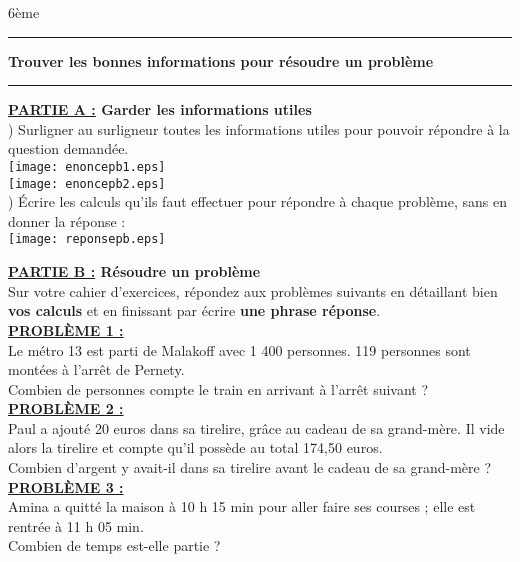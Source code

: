 \documentclass[a4paper,11pt]{article}
\newcounter{enumtabi}
\newcommand{\q}{\stepcounter{enumtabi} \theenumtabi)  }
\newcommand{\titre}[5] 
{
\noindent #2 \hfill #4 \\
#3 \hfill #5

\vspace{-1.6cm}

\begin{center}\rule{6cm}{0.5mm}\end{center}
\vspace{0.2cm}
\begin{center}{\large{\textbf{#1}}}\end{center}
\begin{center}\rule{6cm}{0.5mm}\end{center}
}
\begin{document}
\pagestyle{empty}
\titre{Trouver les bonnes informations pour résoudre un problème}{}{}{6ème}{}


\vspace*{1cm}

{\large \textbf{\underline{PARTIE A :} Garder les informations utiles}}\\


\q Surligner au surligneur toutes les informations utiles pour pouvoir répondre à la question demandée.\\

\texttt{[image: enoncepb1.eps]} \\

\texttt{[image: enoncepb2.eps]} \\

\q Écrire les calculs qu'ils faut effectuer pour répondre à chaque problème, sans en donner la réponse :\\

\texttt{[image: reponsepb.eps]} 

\newpage


{\large \textbf{\underline{PARTIE B :} Résoudre un problème}}\\

Sur votre cahier d'exercices, répondez aux problèmes suivants en détaillant bien \textbf{vos calculs} et en finissant par écrire \textbf{une phrase réponse}.\\

\underline{\textbf{PROBLÈME 1 : }}\\

Le métro 13 est parti de Malakoff avec 1 400 personnes. 119 personnes sont montées à l’arrêt de Pernety.\\
Combien de personnes compte le train en arrivant à l'arrêt suivant ?\\

\underline{\textbf{PROBLÈME 2 :} }\\


Paul a ajouté 20 euros dans sa tirelire, grâce au cadeau de sa grand-mère. Il vide alors la tirelire et compte qu'il possède au total 174,50 euros. \\
Combien d'argent y avait-il dans sa tirelire avant le cadeau de sa grand-mère ?\\


\underline{\textbf{PROBLÈME 3 :} }\\

Amina a quitté la maison à 10 h 15 min pour aller faire ses courses ; elle est rentrée à
11 h 05 min.\\
 Combien de
temps est-elle partie ? \\
\end{document}
